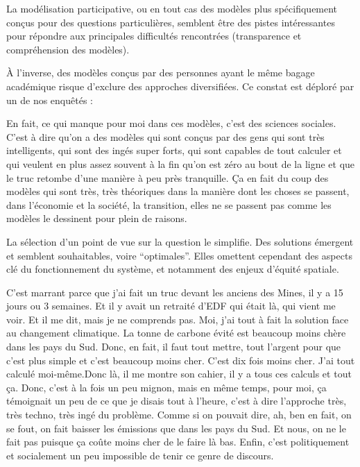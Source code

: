 La modélisation participative, ou en tout cas des modèles plus spécifiquement conçus pour des questions particulières, semblent être des pistes intéressantes pour répondre aux principales difficultés rencontrées (transparence et compréhension des modèles).

À l'inverse, des modèles conçus par des personnes ayant le même bagage académique risque d'exclure des approches diversifiées. Ce constat est déploré par un de nos enquêtés : 

\begin{authoredquote}
    En fait, ce qui manque pour moi dans ces modèles, c'est des sciences sociales. C'est à dire qu'on a des modèles qui sont conçus par des gens qui sont très intelligents, qui sont des ingés super forts, qui sont capables de tout calculer et qui veulent en plus assez souvent à la fin qu'on est zéro au bout de la ligne et que le truc retombe d'une manière à peu près tranquille. Ça en fait du coup des modèles qui sont très, très théoriques dans la manière dont les choses se passent, dans l'économie et la société, la transition, elles ne se passent pas comme les modèles le dessinent pour plein de raisons.
\end{authoredquote}

La sélection d'un point de vue sur la question le simplifie. Des solutions émergent et semblent souhaitables, voire \enquote{optimales}. Elles omettent cependant des aspects clé du fonctionnement du système, et notamment des enjeux d'équité spatiale. 


\begin{authoredquote}
    C'est marrant parce que j'ai fait un truc devant les anciens des Mines, il y a 15 jours ou 3 semaines. Et il y avait un retraité d'EDF qui était là,  qui vient me voir. Et il me dit, mais je ne comprends pas. Moi, j'ai tout à fait la solution face au changement climatique. La tonne de carbone évité est beaucoup moins chère dans les pays du Sud. Donc, en fait, il faut tout mettre, tout l'argent pour que c'est plus simple et c'est beaucoup moins cher. C'est dix fois moins cher. J'ai tout calculé moi-même.Donc là, il me montre son cahier, il y a tous ces calculs et tout ça. Donc, c'est à la fois un peu mignon, mais en même temps, pour moi, ça témoignait un peu de ce que je disais tout à l'heure, c'est à dire l'approche très, très techno, très ingé du problème. Comme si on pouvait dire, ah, ben en fait, on se fout, on fait baisser les émissions que dans les pays du Sud. Et nous, on ne le fait pas puisque ça coûte moins cher de le faire là bas. Enfin, c'est politiquement et socialement un peu impossible de tenir ce genre de discours.
\end{authoredquote}


